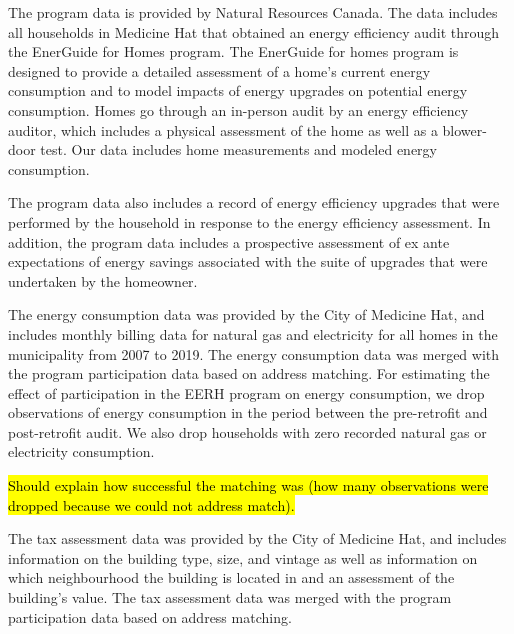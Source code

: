 \documentclass{article}
\newcommand{\hlc}[2][yellow]{ {\sethlcolor{#1} \hl{#2}} }
\begin{document}
The program data is provided by Natural Resources Canada. The data includes all households in Medicine Hat that obtained an energy efficiency audit through the EnerGuide for Homes program. The EnerGuide for homes program is designed to provide a detailed assessment of a home's current energy consumption and to model impacts of energy upgrades on potential energy consumption. Homes go through an in-person audit by an energy efficiency auditor, which includes a physical assessment of the home as well as a blower-door test. Our data includes home measurements and modeled energy consumption.

The program data also includes a record of energy efficiency upgrades that were performed by the household in response to the energy efficiency assessment. In addition, the program data includes a prospective assessment of ex ante expectations of energy savings associated with the suite of upgrades that were undertaken by the homeowner.

The energy consumption data was provided by the City of Medicine Hat, and includes monthly billing data for natural gas and electricity for all homes in the municipality from 2007 to 2019.  The energy consumption data was merged with the program participation data based on address matching.  For estimating the effect of participation in the EERH program on energy consumption, we drop observations of energy consumption in the period between the pre-retrofit and post-retrofit audit.  We also drop households with zero recorded natural gas or electricity consumption.

\hlc{Should explain how successful the matching was (how many observations were dropped because we could not address match).}

The tax assessment data was provided by the City of Medicine Hat, and includes information on the building type, size, and vintage as well as information on which neighbourhood the building is located in and an assessment of the building's value. The tax assessment data was merged with the program participation data based on address matching.
\end{document}
